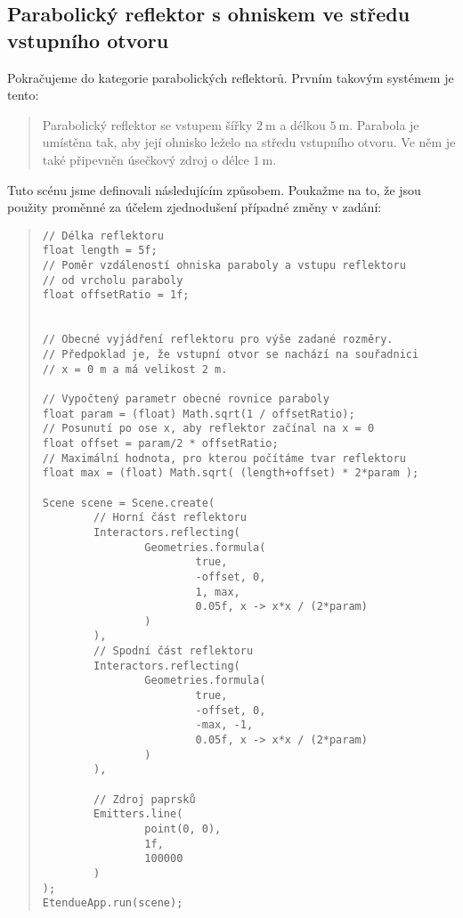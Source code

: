 \subsection{Parabolický reflektor s ohniskem ve středu vstupního otvoru}

Pokračujeme do kategorie parabolických reflektorů. Prvním takovým systémem je tento:

\begin{quote}
    Parabolický reflektor se vstupem šířky $2\ \mathrm{m}$ a délkou $5\ \mathrm{m}$. Parabola je umístěna tak, aby její ohnisko leželo na středu vstupního otvoru. Ve něm je také připevněn úsečkový zdroj o délce $1\ \mathrm{m}$.
\end{quote}

Tuto scénu jsme definovali následujícím způsobem. Poukažme na to, že jsou použity proměnné za účelem zjednodušení případné změny v zadání:

\begin{minipage}{\textwidth}\begin{quote}\begin{lstlisting}
// Délka reflektoru
float length = 5f;
// Poměr vzdáleností ohniska paraboly a vstupu reflektoru
// od vrcholu paraboly
float offsetRatio = 1f;


// Obecné vyjádření reflektoru pro výše zadané rozměry.
// Předpoklad je, že vstupní otvor se nachází na souřadnici
// x = 0 m a má velikost 2 m.

// Vypočtený parametr obecné rovnice paraboly
float param = (float) Math.sqrt(1 / offsetRatio);
// Posunutí po ose x, aby reflektor začínal na x = 0
float offset = param/2 * offsetRatio;
// Maximální hodnota, pro kterou počítáme tvar reflektoru
float max = (float) Math.sqrt( (length+offset) * 2*param );

Scene scene = Scene.create(
        // Horní část reflektoru
        Interactors.reflecting(
                Geometries.formula(
                        true,
                        -offset, 0,
                        1, max,
                        0.05f, x -> x*x / (2*param)
                )
        ),
        // Spodní část reflektoru
        Interactors.reflecting(
                Geometries.formula(
                        true,
                        -offset, 0,
                        -max, -1,
                        0.05f, x -> x*x / (2*param)
                )
        ),

        // Zdroj paprsků
        Emitters.line(
                point(0, 0),
                1f,
                100000
        )
);
EtendueApp.run(scene);
\end{lstlisting}\end{quote}\end{minipage}

